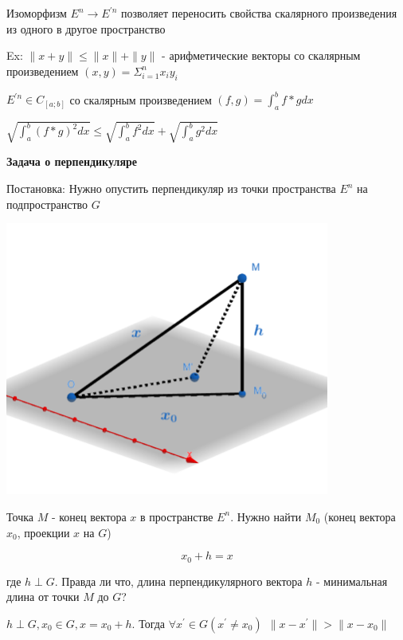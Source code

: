 \documentclass[12pt]{article}
\begin{document}
    \tableofcontents
    \clearpage

    








    \Nota Изоморфизм $E^n \rightarrow E^{\prime n}$ позволяет переносить свойства скалярного произведения
    из одного в другое пространство

    Ex: $\|x + y\| \leq \|x\| + \|y\|$ - арифметические векторы со скалярным произведением $(x, y) = \Sigma^n_{i=1} x_i y_i$

    $E^{\prime n} \in C_{[a;b]}$ со скалярным произведением $\displaystyle (f, g) = \int^b_a f * g dx$

    $\displaystyle \sqrt{\int^b_a (f * g)^2 dx} \leq \sqrt{\int^b_a f^2 dx} + \sqrt{\int^b_a g^2 dx}$

    \textbf{Задача о перпендикуляре}

    Постановка: Нужно опустить перпендикуляр из точки пространства $E^n$ на подпространство $G$

    \includegraphics[height=90mm]{images/specsec_2024_03_01_1}

    Точка $M$ - конец вектора $x$ в пространстве $E^n$.
    Нужно найти $M_0$ (конец вектора $x_0$, проекции $x$ на $G$)

    \[x_0 + h = x\]

    где $h \perp G$. Правда ли что, длина перпендикулярного вектора $h$ - минимальная длина от точки $M$ до $G$?

    \Th $h \perp G, x_0 \in G, x = x_0 + h$. Тогда $\forall x^\prime \in G (x^\prime \neq x_0) \ \ \|x - x^\prime\| > \|x - x_0\|$
\end{document}
